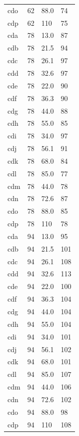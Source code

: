 \documentclass[draft]{assets/agujournal2019}
\begin{document}
\begin{longtable}{A{0.13} B{0.12} B{0.12} B{0.10}}
 cdo        & 62         & 88.0       & 74    \\
 cdp        & 62         & 110        & 75    \\
 cda        & 78         & 13.0       & 87    \\
 cdb        & 78         & 21.5       & 94    \\
 cdc        & 78         & 26.1       & 97    \\
 cdd        & 78         & 32.6       & 97    \\
 cde        & 78         & 22.0       & 90    \\
 cdf        & 78         & 36.3       & 90    \\
 cdg        & 78         & 44.0       & 88    \\
 cdh        & 78         & 55.0       & 85    \\
 cdi        & 78         & 34.0       & 97    \\
 cdj        & 78         & 56.1       & 91    \\
 cdk        & 78         & 68.0       & 84    \\
 cdl        & 78         & 85.0       & 77    \\
 cdm        & 78         & 44.0       & 78    \\
 cdn        & 78         & 72.6       & 87    \\
 cdo        & 78         & 88.0       & 85    \\
 cdp        & 78         & 110        & 78    \\
 cda        & 94         & 13.0       & 95    \\
 cdb        & 94         & 21.5       & 101   \\
 cdc        & 94         & 26.1       & 108   \\
 cdd        & 94         & 32.6       & 113   \\
 cde        & 94         & 22.0       & 100   \\
 cdf        & 94         & 36.3       & 104   \\
 cdg        & 94         & 44.0       & 104   \\
 cdh        & 94         & 55.0       & 104   \\
 cdi        & 94         & 34.0       & 101   \\
 cdj        & 94         & 56.1       & 102   \\
 cdk        & 94         & 68.0       & 101   \\
 cdl        & 94         & 85.0       & 107   \\
 cdm        & 94         & 44.0       & 106   \\
 cdn        & 94         & 72.6       & 102   \\
 cdo        & 94         & 88.0       & 98    \\
 cdp        & 94         & 110        & 108   \\
\end{longtable}
\end{document}
